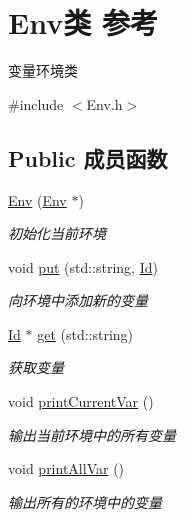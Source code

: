 \hypertarget{class_env}{}\section{Env类 参考}
\label{class_env}


变量环境类  




{\ttfamily \#include $<$Env.\+h$>$}

\subsection*{Public 成员函数}
\begin{DoxyCompactItemize}
\item 
\hyperlink{class_env_ab9d20c5b47453e30038f156cc5e25c0f}{Env} (\hyperlink{class_env}{Env} $\ast$)
\begin{DoxyCompactList}\small\item\em 初始化当前环境 \end{DoxyCompactList}\item 
void \hyperlink{class_env_a4648c2b83fea7e757ccb4ab519ffc9a0}{put} (std\+::string, \hyperlink{class_id}{Id})\hypertarget{class_env_a4648c2b83fea7e757ccb4ab519ffc9a0}{}\label{class_env_a4648c2b83fea7e757ccb4ab519ffc9a0}

\begin{DoxyCompactList}\small\item\em 向环境中添加新的变量 \end{DoxyCompactList}\item 
\hyperlink{class_id}{Id} $\ast$ \hyperlink{class_env_a59bbdcdb7af396f6fb6cbff2f828e62b}{get} (std\+::string)
\begin{DoxyCompactList}\small\item\em 获取变量 \end{DoxyCompactList}\item 
void \hyperlink{class_env_a398c166330482abb7e38c546bc3974cf}{print\+Current\+Var} ()
\begin{DoxyCompactList}\small\item\em 输出当前环境中的所有变量 \end{DoxyCompactList}\item 
void \hyperlink{class_env_a8ba6704ef2039c2329569efc99f1e087}{print\+All\+Var} ()
\begin{DoxyCompactList}\small\item\em 输出所有的环境中的变量 \end{DoxyCompactList}\end{DoxyCompactItemize}
